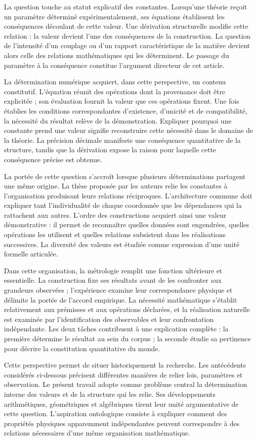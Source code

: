 La question touche au statut explicatif des constantes. Lorsqu'une
théorie reçoit un paramètre déterminé expérimentalement, ses équations
établissent les conséquences découlant de cette valeur. Une dérivation
structurelle modifie cette relation : la valeur devient l'une des
conséquences de la construction. La question de l'intensité d'un
couplage ou d'un rapport caractéristique de la matière devient
alors celle des relations mathématiques qui les déterminent.
Le passage du paramètre à la conséquence constitue l'argument directeur
de cet article.

La détermination numérique acquiert, dans cette perspective, un contenu
constitutif. L'équation réunit des opérations dont la provenance doit être
explicitée ; son évaluation fournit la valeur que ces opérations fixent. Une
fois établies les conditions correspondantes d'existence, d'unicité et de compatibilité,
la nécessité du résultat relève de la démonstration.
Expliquer pourquoi une constante prend une valeur signifie reconstruire cette
nécessité dans le domaine de la théorie. La précision décimale manifeste
une conséquence quantitative de la structure, tandis que la dérivation
expose la raison pour laquelle cette conséquence précise est obtenue.

La portée de cette question s'accroît lorsque plusieurs déterminations
partagent une même origine. La thèse proposée par les auteurs relie
les constantes à l'organisation produisant leurs relations réciproques.
L'architecture commune doit expliquer tant l'individualité de chaque
coordonnée que les dépendances qui la rattachent aux autres.
L'ordre des constructions acquiert ainsi une valeur démonstrative :
il permet de reconnaître quelles données sont engendrées, quelles opérations les utilisent et
quelles relations subsistent dans les réalisations successives. La diversité
des valeurs est étudiée comme expression d'une unité formelle articulée.

Dans cette organisation, la métrologie remplit une fonction ultérieure et
essentielle. La construction fixe ses résultats avant de les confronter aux
grandeurs observées ; l'expérience examine leur correspondance
physique et délimite la portée de l'accord empirique. La nécessité mathématique s'établit
relativement aux prémisses et aux opérations déclarées, et la réalisation
naturelle est examinée par l'identification des observables et leur
confrontation indépendante. Les deux tâches contribuent à une explication
complète : la première détermine le résultat au sein du corpus ; la seconde
étudie sa pertinence pour décrire la constitution quantitative du
monde.

Cette perspective permet de situer historiquement la recherche. Les
antécédents considérés ci-dessous précisent différentes manières de
relier lois, paramètres et observation. Le présent travail adopte
comme problème central la détermination interne des valeurs et de la
structure qui les relie. Ses développements arithmétiques, géométriques et
algébriques tirent leur unité argumentative de cette question. L'aspiration
ontologique consiste à expliquer comment des propriétés physiques apparemment
indépendantes peuvent correspondre à des relations nécessaires d'une même
organisation mathématique.
